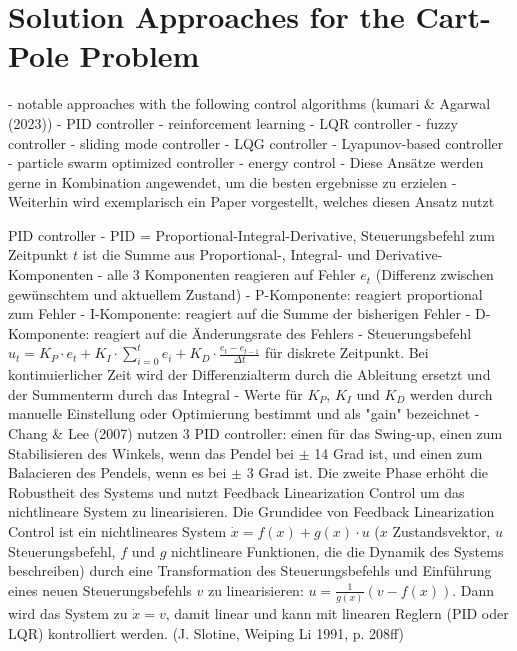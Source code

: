 \section{Solution Approaches for the Cart-Pole Problem}

- notable approaches with the following control algorithms (kumari & Agarwal (2023))
- PID controller
- reinforcement learning
- LQR controller
- fuzzy controller
- sliding mode controller
- LQG controller
- Lyapunov-based controller
- particle swarm optimized controller
- energy control
- Diese Ansätze werden gerne in Kombination angewendet, um die besten ergebnisse zu erzielen
- Weiterhin wird exemplarisch ein Paper vorgestellt, welches diesen Ansatz nutzt

PID controller
- PID = Proportional-Integral-Derivative, Steuerungsbefehl zum Zeitpunkt $t$ ist die Summe aus Proportional-, Integral- und Derivative-Komponenten
- alle 3 Komponenten reagieren auf Fehler $e_t$ (Differenz zwischen gewünschtem und aktuellem Zustand)
- P-Komponente: reagiert proportional zum Fehler
- I-Komponente: reagiert auf die Summe der bisherigen Fehler
- D-Komponente: reagiert auf die Änderungsrate des Fehlers
- Steuerungsbefehl $u_t = K_P\cdot e_t + K_I\cdot\sum_{i=0}^t e_i + K_D\cdot\frac{e_t - e_{t-1}}{\Delta t}$ für diskrete Zeitpunkt. Bei kontinuierlicher Zeit wird der Differenzialterm durch die Ableitung ersetzt und der Summenterm durch das Integral
- Werte für $K_P$, $K_I$ und $K_D$ werden durch manuelle Einstellung oder Optimierung bestimmt und als "gain" bezeichnet
- Chang & Lee (2007) nutzen 3 PID controller:  einen für das Swing-up, einen zum Stabilisieren des Winkels, wenn das Pendel bei $\pm$ 14 Grad ist, und einen zum Balacieren des Pendels, wenn es bei $\pm$ 3 Grad ist. Die zweite Phase erhöht die Robustheit des Systems und nutzt Feedback Linearization Control um das nichtlineare System zu linearisieren. Die Grundidee von Feedback Linearization Control ist ein nichtlineares System $\dot{x} = f(x) + g(x)\cdot u$ ($x$ Zustandsvektor, $u$ Steuerungsbefehl, $f$ und $g$ nichtlineare Funktionen, die die Dynamik des Systems beschreiben) durch eine Transformation des Steuerungsbefehls und Einführung eines neuen Steuerungsbefehls $v$ zu linearisieren: $u = \frac{1}{g(x)}(v - f(x))$. Dann wird das System zu $\dot{x}=v$, damit linear und kann mit linearen Reglern (PID oder LQR) kontrolliert werden. (J. Slotine, Weiping Li 1991, p. 208ff)

